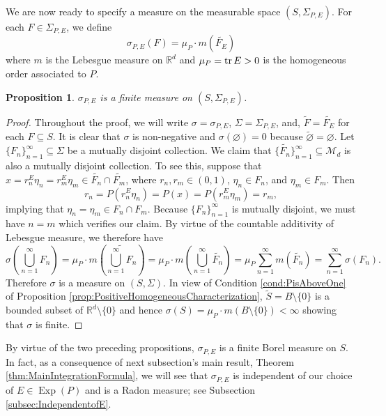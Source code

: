 \documentclass[11pt]{article}
\newtheorem{proposition}[theorem]{Proposition}
\theoremstyle{remark}
\newcommand\Exp{\operatorname{Exp}}
\begin{document}
\noindent We are now ready to specify a measure on the measurable space $(S,\Sigma_{P,E})$. For each $F\in \Sigma_{P,E}$, we define
\begin{equation*}
\sigma_{P,E}(F)=\mu_P\cdot m(\widetilde{F_E})
\end{equation*}
where $m$ is the Lebesgue measure on $\mathbb{R}^d$ and $\mu_P=\tr E>0$ is the homogeneous order associated to $P$.

\begin{proposition}\label{prop:sigmaisameaure}
$\sigma_{P,E}$ is a finite measure on $(S,\Sigma_{P,E})$.
\end{proposition}
\begin{proof}

\noindent Throughout the proof, we will write $\sigma=\sigma_{P,E}$, $\Sigma=\Sigma_{P,E}$, and, $\widetilde{F}=\widetilde{F_E}$ for each $F\subseteq S$. It is clear that $\sigma$ is non-negative and $\sigma(\varnothing)=0$ because $\widetilde{\varnothing}=\varnothing$. Let $\{ F_n  \}^\infty_{n=1} \subseteq \Sigma $ be a mutually disjoint collection. We claim that $\{ \widetilde{F_n} \}_{n=1}^\infty\subseteq\mathcal{M}_d$ is also a mutually disjoint collection. To see this, suppose that $x = r_n^E \eta_n = r_m^E \eta_m\in \widetilde{F_n}\cap\widetilde{F_m}$, where $r_n,r_m \in (0,1)$, $\eta_n \in F_n$, and $\eta_m \in F_m $. Then
\begin{equation*}
    r_n = P(r_n^E \eta_n) = P(x) = P(r_m^E \eta_m) = r_m,
\end{equation*}
implying that $\eta_n = \eta_m\in F_n\cap F_m$. Because $\{F_n\}_{n=1}^\infty$ is mutually disjoint, we must have $n=m$ which verifies our claim. By virtue of the countable additivity of Lebesgue measure, we therefore have
\begin{equation*}
\sigma\left(\bigcup_{n=1}^\infty F_n\right)
    = \mu_P\cdot m\left( \widetilde{\bigcup^\infty_{n=1} F_n } \right)=\mu_P\cdot m\left( \bigcup^\infty_{n=1}\widetilde{F_n} \right)
    = \mu_P\sum^\infty_{n=1} m(\widetilde{F_n})
    = \sum^\infty_{n=1}\sigma(F_n).
\end{equation*}
Therefore $\sigma$ is a measure on $(S,\Sigma)$. In view of Condition \ref{cond:PisAboveOne} of Proposition \ref{prop:PositiveHomogeneousCharacterization}, $\widetilde{S}=B\setminus\{0\}$ is a bounded subset of $\mathbb{R}^d\setminus\{0\}$ and hence $\sigma(S)=\mu_P\cdot m(B\setminus\{0\})<\infty$ showing that $\sigma$ is finite.
\end{proof}

\noindent By virtue of the two preceding propositions, $\sigma_{P,E}$ is a finite Borel measure on $S$. In fact, as a consequence of next subsection's main result, Theorem \ref{thm:MainIntegrationFormula}, we will see that $\sigma_{P,E}$ is independent of our choice of $E\in\Exp(P)$ and is a Radon measure; see Subsection \ref{subsec:IndependentofE}.
\end{document}
